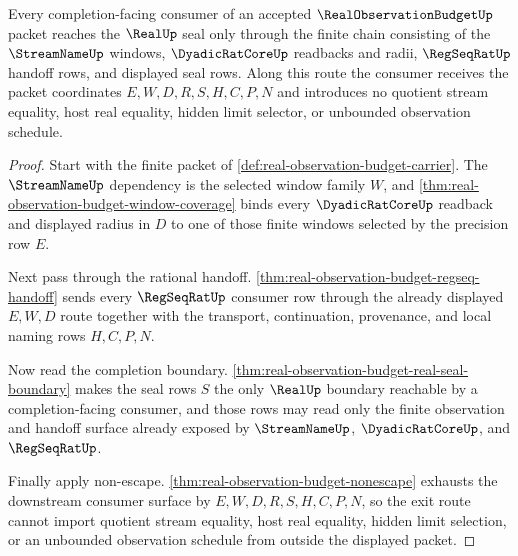 \begin{theorem}
\label{thm:real-observation-budget-streamname-regseq-real-exit}
Every completion-facing consumer of an accepted $\RealObservationBudgetUp$ packet reaches the $\RealUp$ seal only through the finite chain consisting of the $\StreamNameUp$ windows, $\DyadicRatCoreUp$ readbacks and radii, $\RegSeqRatUp$ handoff rows, and displayed seal rows. Along this route the consumer receives the packet coordinates $E,W,D,R,S,H,C,P,N$ and introduces no quotient stream equality, host real equality, hidden limit selector, or unbounded observation schedule.
\end{theorem}
\begin{proof}
Start with the finite packet of \autoref{def:real-observation-budget-carrier}. The $\StreamNameUp$ dependency is the selected window family $W$, and \autoref{thm:real-observation-budget-window-coverage} binds every $\DyadicRatCoreUp$ readback and displayed radius in $D$ to one of those finite windows selected by the precision row $E$.

Next pass through the rational handoff. \autoref{thm:real-observation-budget-regseq-handoff} sends every $\RegSeqRatUp$ consumer row through the already displayed $E,W,D$ route together with the transport, continuation, provenance, and local naming rows $H,C,P,N$.

Now read the completion boundary. \autoref{thm:real-observation-budget-real-seal-boundary} makes the seal rows $S$ the only $\RealUp$ boundary reachable by a completion-facing consumer, and those rows may read only the finite observation and handoff surface already exposed by $\StreamNameUp$, $\DyadicRatCoreUp$, and $\RegSeqRatUp$.

Finally apply non-escape. \autoref{thm:real-observation-budget-nonescape} exhausts the downstream consumer surface by $E,W,D,R,S,H,C,P,N$, so the exit route cannot import quotient stream equality, host real equality, hidden limit selection, or an unbounded observation schedule from outside the displayed packet.
\end{proof}

